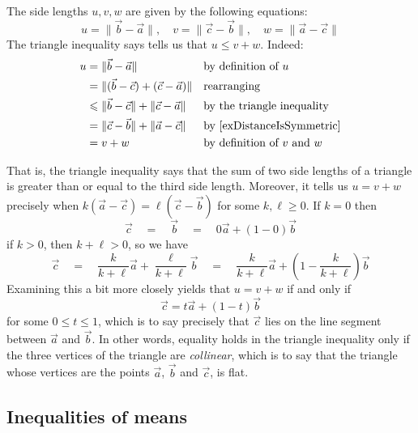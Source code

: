 \begin{center}
\end{center}

The side lengths $u,v,w$ are given by the following equations:
\[ u = \lVert \vec b - \vec a \rVert, \quad v = \lVert \vec c - \vec b \rVert, \quad w = \lVert \vec a - \vec c \rVert \]
The triangle inequality says tells us that $u \le v + w$. Indeed:
\begin{align*}
u &= \lVert \vec b - \vec a \rVert && \text{by definition of $u$} \\
&= \lVert (\vec b - \vec c) + (\vec c - \vec a) \rVert && \text{rearranging} \\
&\le \lVert \vec b - \vec c \rVert + \lVert \vec c - \vec a \rVert && \text{by the triangle inequality} \\
&= \lVert \vec c - \vec b \rVert + \lVert \vec a - \vec c \rVert && \text{by \Cref{exDistanceIsSymmetric}} \\
&= v + w && \text{by definition of $v$ and $w$}
\end{align*}

That is, the triangle inequality says that the sum of two side lengths of a triangle is greater than or equal to the third side length. Moreover, it tells us $u=v+w$ precisely when $k(\vec a - \vec c) = \ell(\vec c - \vec b)$ for some $k,\ell \ge 0$. If $k=0$ then
\[ \vec c \quad = \quad \vec b \quad = \quad 0 \vec a + (1-0) \vec b \]
if $k>0$, then $k+\ell>0$, so we have
\[ \vec c \quad = \quad \frac{k}{k+\ell} \vec a + \frac{\ell}{k+\ell} \vec b \quad = \quad \frac{k}{k+\ell} \vec a + \left( 1 - \frac{k}{k+\ell} \right)\vec b \]
Examining this a bit more closely yields that $u=v+w$ if and only if
\[ \vec c = t\vec a + (1-t) \vec b \]
for some $0 \le t \le 1$, which is to say precisely that $\vec c$ lies on the line segment between $\vec a$ and $\vec b$. In other words, equality holds in the triangle inequality only if the three vertices of the triangle are \textit{collinear}, which is to say that the triangle whose vertices are the points $\vec a$, $\vec b$ and $\vec c$, is flat.

\subsection*{Inequalities of means}

